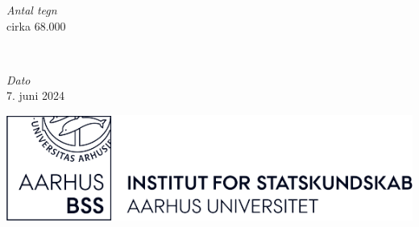 
	\begin{minipage}{0.4\textwidth}
		\begin{flushleft}
			\large
			\textit{Antal tegn}\\
			cirka 68.000\\
		\end{flushleft}
	\end{minipage}
	~
	\begin{minipage}{0.4\textwidth}
		\begin{flushright}
			\large
			\textit{Dato}\\
			7. juni 2024
		\end{flushright}
	\end{minipage}





	\vfill\vfill
	\includegraphics[width=4\textwidth]{format/images/ifsk-logo-black.png}\\[1cm] %
